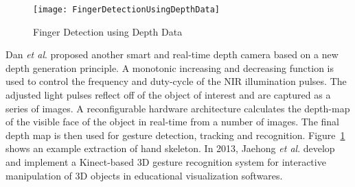 %
\begin{figure}[t]
\centering
\texttt{[image: FingerDetectionUsingDepthData]}
\caption{Finger Detection using Depth Data \cite{NIRGesture14}}
\label{FingerDetectionUsingDepthData}
\end{figure}%
Dan \textit{et al}. \cite{NIRGesture14} proposed another smart and real-time depth camera based on a new depth generation principle. A monotonic increasing and decreasing function is used to control the frequency and duty-cycle of the \gls{NIR} illumination pulses. The adjusted light pulses reflect off of the object of interest and are captured as a series of images. A reconfigurable hardware architecture calculates the depth-map of the visible face of the object in real-time from a number of images. The final depth map is then used for gesture detection, tracking and recognition. Figure~\ref{FingerDetectionUsingDepthData} shows an example extraction of hand skeleton. In 2013, Jaehong \textit{et al}. \cite{InteractiveManipulation_2013} develop and implement a Kinect-based \gls{3D} gesture recognition system for interactive
manipulation of \gls{3D} objects in educational visualization softwares. 
\\\indent%
%
